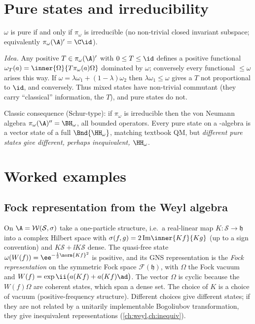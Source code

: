 \section{Pure states and irreducibility}

\begin{theorem}
$\omega$ is pure if and only if $\pi_\omega$ is irreducible (no non-trivial closed invariant subspace; equivalently $\pi_\omega(\A)'=\C\id$).
\end{theorem}
\emph{Idea.} Any positive $T\in\pi_\omega(\A)'$ with $0\le T\le\id$ defines a positive functional $\omega_T(a)=\inner{\Omega}{T\pi_\omega(a)\Omega}$ dominated by $\omega$; conversely every functional $\le\omega$ arises this way. If $\omega=\lambda\omega_1+(1-\lambda)\omega_2$ then $\lambda\omega_1\le\omega$ gives a $T$ not proportional to $\id$, and conversely. Thus mixed states have non-trivial commutant (they carry ``classical'' information, the $T$), and pure states do not.

Classic consequence (Schur-type): if $\pi_\omega$ is irreducible then the von Neumann algebra $\pi_\omega(\A)''=\BH_\omega$, all bounded operators. Every pure state on a \cstar-algebra is a vector state of a full $\Bnd{\HH_\omega}$, matching textbook QM, but \emph{different pure states give different, perhaps inequivalent, $\HH_\omega$}.

\section{Worked examples}

\subsection{Fock representation from the Weyl algebra}
On $\A=\mathcal W(\mathcal S,\sigma)$ take a one-particle structure, i.e.\ a real-linear map $K:\mathcal S\to\mathfrak h$ into a complex Hilbert space with $\sigma(f,g)=2\,\mathrm{Im}\inner{Kf}{Kg}$ (up to a sign convention) and $K\mathcal S+\ii K\mathcal S$ dense. The quasi-free state $\omega(W(f))=\ee^{-\frac12\norm{Kf}^2}$ is positive, and its GNS representation is the \emph{Fock representation} on the symmetric Fock space $\mathcal F(\mathfrak h)$, with $\Omega$ the Fock vacuum and $W(f)=\exp\ii\big(a(Kf)+a(Kf)\ad\big)$. The vector $\Omega$ is cyclic because the $W(f)\Omega$ are coherent states, which span a dense set. The choice of $K$ is a choice of vacuum (positive-frequency structure). Different choices give different states; if they are not related by a unitarily implementable Bogoliubov transformation, they give inequivalent representations (\cref{ch:weyl,ch:inequiv}).

